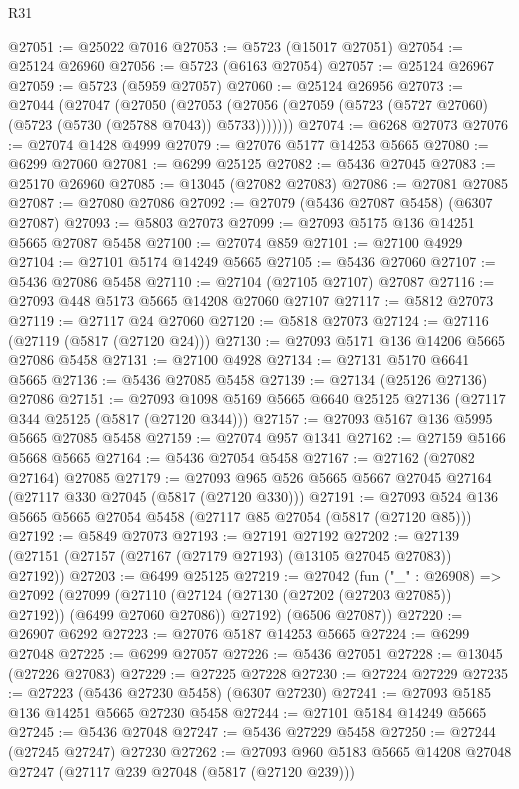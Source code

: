 \begin{lexlean}{R31}
\begin{coremodule}
@27051 := @25022 @7016
@27053 := @5723 (@15017 @27051)
@27054 := @25124 @26960
@27056 := @5723 (@6163 @27054)
@27057 := @25124 @26967
@27059 := @5723 (@5959 @27057)
@27060 := @25124 @26956
@27073 := @27044
    (@27047
      (@27050
        (@27053 (@27056 (@27059 (@5723 (@5727 @27060) (@5723 (@5730 (@25788 @7043)) @5733)))))))
@27074 := @6268 @27073
@27076 := @27074 @1428 @4999
@27079 := @27076 @5177 @14253 @5665
@27080 := @6299 @27060
@27081 := @6299 @25125
@27082 := @5436 @27045
@27083 := @25170 @26960
@27085 := @13045 (@27082 @27083)
@27086 := @27081 @27085
@27087 := @27080 @27086
@27092 := @27079 (@5436 @27087 @5458) (@6307 @27087)
@27093 := @5803 @27073
@27099 := @27093 @5175 @136 @14251 @5665 @27087 @5458
@27100 := @27074 @859
@27101 := @27100 @4929
@27104 := @27101 @5174 @14249 @5665
@27105 := @5436 @27060
@27107 := @5436 @27086 @5458
@27110 := @27104 (@27105 @27107) @27087
@27116 := @27093 @448 @5173 @5665 @14208 @27060 @27107
@27117 := @5812 @27073
@27119 := @27117 @24 @27060
@27120 := @5818 @27073
@27124 := @27116 (@27119 (@5817 (@27120 @24)))
@27130 := @27093 @5171 @136 @14206 @5665 @27086 @5458
@27131 := @27100 @4928
@27134 := @27131 @5170 @6641 @5665
@27136 := @5436 @27085 @5458
@27139 := @27134 (@25126 @27136) @27086
@27151 := @27093 @1098 @5169 @5665 @6640 @25125 @27136 (@27117 @344 @25125 (@5817 (@27120 @344)))
@27157 := @27093 @5167 @136 @5995 @5665 @27085 @5458
@27159 := @27074 @957 @1341
@27162 := @27159 @5166 @5668 @5665
@27164 := @5436 @27054 @5458
@27167 := @27162 (@27082 @27164) @27085
@27179 := @27093 @965 @526 @5665 @5667 @27045 @27164 (@27117 @330 @27045 (@5817 (@27120 @330)))
@27191 := @27093 @524 @136 @5665 @5665 @27054 @5458 (@27117 @85 @27054 (@5817 (@27120 @85)))
@27192 := @5849 @27073
@27193 := @27191 @27192
@27202 := @27139 (@27151 (@27157 (@27167 (@27179 @27193) (@13105 @27045 @27083)) @27192))
@27203 := @6499 @25125
@27219 := @27042
    (fun ("_" : @26908) =>
    @27092
      (@27099
        (@27110 (@27124 (@27130 (@27202 (@27203 @27085)) @27192)) (@6499 @27060 @27086))
        @27192)
      (@6506 @27087))
@27220 := @26907 @6292
@27223 := @27076 @5187 @14253 @5665
@27224 := @6299 @27048
@27225 := @6299 @27057
@27226 := @5436 @27051
@27228 := @13045 (@27226 @27083)
@27229 := @27225 @27228
@27230 := @27224 @27229
@27235 := @27223 (@5436 @27230 @5458) (@6307 @27230)
@27241 := @27093 @5185 @136 @14251 @5665 @27230 @5458
@27244 := @27101 @5184 @14249 @5665
@27245 := @5436 @27048
@27247 := @5436 @27229 @5458
@27250 := @27244 (@27245 @27247) @27230
@27262 := @27093 @960 @5183 @5665 @14208 @27048 @27247 (@27117 @239 @27048 (@5817 (@27120 @239)))

\end{coremodule}
\end{lexlean}
